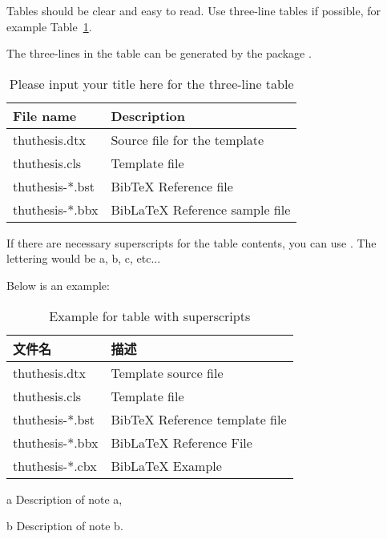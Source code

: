 Tables should be clear and easy to read. Use three-line tables if possible, for example Table~\ref{tab:three-line}.

The three-lines in the table can be generated by the package .

\begin{table}
  \centering
  \caption{Please input your title here for the three-line table}
  \begin{tabular}{ll}
    \toprule
    File name          & Description               \\
    \midrule
    thuthesis.dtx   & Source file for the template \\
    thuthesis.cls   & Template file                \\
    thuthesis-*.bst & BibTeX Reference file        \\
    thuthesis-*.bbx & BibLaTeX Reference sample file \\
   
    \bottomrule
  \end{tabular}
  \label{tab:three-line}
\end{table}

If there are necessary superscripts for the table contents, you can use . The lettering would be a, b, c, etc...

Below is an example:

\begin{table}
  \centering
  \begin{threeparttable}[c]
    \caption{Example for table with superscripts}
    \label{tab:three-part-table}
    \begin{tabular}{ll}
      \toprule
      文件名                 & 描述                         \\
      \midrule
      thuthesis.dtx\tnote{a} & Template source file \\
      thuthesis.cls\tnote{b} & Template file        \\
      thuthesis-*.bst        & BibTeX Reference template file                                 \\
      thuthesis-*.bbx        & BibLaTeX Reference File                                               \\
      thuthesis-*.cbx        & BibLaTeX Example     \\
      \bottomrule
    \end{tabular}
    \begin{tablenotes}
      \item [a] Description of note a,
      \item [b] Description of note b.
    \end{tablenotes}
  \end{threeparttable}
\end{table}
